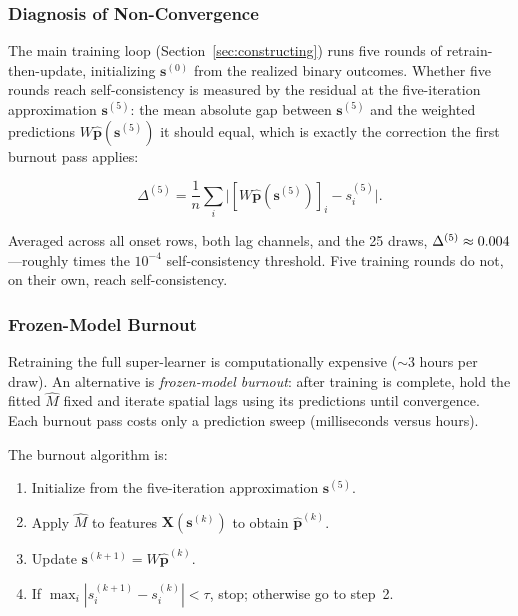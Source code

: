\subsubsection{Diagnosis of Non-Convergence}

The main training loop (Section~\ref{sec:constructing}) runs five rounds of
retrain-then-update, initializing $\mathbf{s}^{(0)}$ from the realized binary
outcomes.  Whether five rounds reach self-consistency is measured by the
residual at the five-iteration approximation $\mathbf{s}^{(5)}$: the mean
absolute gap between $\mathbf{s}^{(5)}$ and the weighted predictions
$W\hat{\mathbf{p}}(\mathbf{s}^{(5)})$ it should equal, which is exactly the
correction the first burnout pass applies:

\begin{equation*}
\Delta^{(5)} = \frac{1}{n} \sum_i \bigl| [W\hat{\mathbf{p}}(\mathbf{s}^{(5)})]_i - s_i^{(5)} \bigr|.
\end{equation*}

Averaged across all onset rows, both lag channels, and the 25 draws,
$\Delta^{(5)} \approx 0.004$---roughly \BurnoutStartX{} times the
$10^{-4}$ self-consistency threshold.  Five training rounds do not, on their
own, reach self-consistency.

\subsubsection{Frozen-Model Burnout}

Retraining the full super-learner is computationally expensive (${\sim}$3 hours per
draw).  An alternative is \textit{frozen-model burnout}: after training is complete,
hold the fitted $\hat{M}$ fixed and iterate spatial lags using its predictions
until convergence.  Each burnout pass costs only a prediction sweep
(milliseconds versus hours).

The burnout algorithm is:
\begin{enumerate}
\item Initialize from the five-iteration approximation $\mathbf{s}^{(5)}$.
\item Apply $\hat{M}$ to features $\mathbf{X}(\mathbf{s}^{(k)})$ to obtain $\hat{\mathbf{p}}^{(k)}$.
\item Update $\mathbf{s}^{(k+1)} = W \hat{\mathbf{p}}^{(k)}$.
\item If $\max_i |s_i^{(k+1)} - s_i^{(k)}| < \tau$, stop; otherwise go to step~2.
\end{enumerate}


